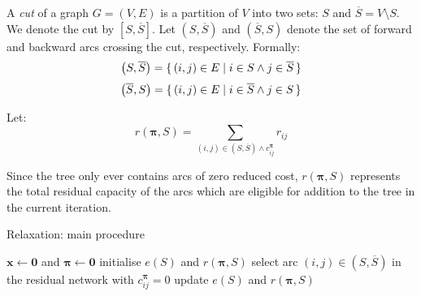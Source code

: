 \begin{defn}[Cuts] \label{defn:relax-cuts}
A \emph{cut} of a graph $G = (V,E)$ is a partition of $V$ into two sets: $S$ and $\overline{S} = V \setminus S$. We denote the cut by $\left[S,\overline{S}\right]$. Let $\left(S,\overline{S}\right)$ and $\left(\overline{S},S\right)$ denote the set of forward and backward arcs crossing the cut, respectively. Formally:
\[\left(S,\overline{S}\right) = \set{(i,j) \in E | i \in S \land j \in \overline{S}}\]
\[\left(\overline{S},S\right) = \set{(i,j) \in E | i \in \overline{S} \land j \in S}\]
\end{defn}

\begin{defn} \label{defn:relax-tree-residual}
Let:
\begin{equation} \label{eq:relax-tree-residual}
r(\boldsymbol{\pi},S) = \sum_{(i,j) \in \left(S,\overline{S}\right) \land c_{ij}^{\boldsymbol{\pi}}} r_{ij}
\end{equation}
\end{defn}

\begin{remark}
Since the tree only ever contains arcs of zero reduced cost, $r(\boldsymbol{\pi},S)$ represents the total residual capacity of the arcs which are eligible for addition to the tree in the current iteration.
\end{remark}

\begin{algorithm}
    \caption{Relaxation: main procedure}
    \label{algo:relaxation}
    \begin{algorithmic}[1]
        \State $\mathbf{x} \gets \mathbf{0}$ and $\boldsymbol{\pi} \gets \mathbf{0}$ \label{algo:relaxation:initialisation}
         \label{algo:relaxation:outer-loop-start}
        \State initialise $e(S)$ and $r(\boldsymbol{\pi},S)$
         \label{algo:relaxation:first-update-potentials}
        \EndIf
        \label{algo:relaxation:inner-loop-start}
        \State select arc $(i,j) \in \left(S,\overline{S}\right)$ in the residual network with $c_{ij}^{\boldsymbol{\pi}}=0$ \label{algo:relaxation:select-arc}
         \label{algo:relaxation:if-source}
         \label{algo:relaxation:update-predecessor}
         \label{algo:relaxation:add-vertex}
        \State update $e(S)$ and $r(\boldsymbol{\pi},S)$ 
        \label{algo:relaxation:end-if-source}
        \Else
        \State {} \label{algo:relaxation:augment}
        \Break
        \EndIf
        \EndWhile \label{algo:relaxation:inner-loop-end}
         \label{algo:relaxation:second-update-potentials}
        \EndIf
        \EndWhile \label{algo:relaxation:outer-loop-end}
    \end{algorithmic}
\end{algorithm}

